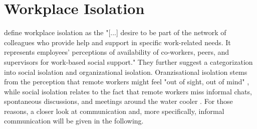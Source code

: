 \section{Workplace Isolation}
\textcite{marshall2007workplace} define workplace isolation as the "[...] desire to be part of the network of colleagues who provide help and support in specific work-related needs. It represents employees' perceptions of availability of co-workers, peers, and supervisors for work-based social support." They further suggest a categorization into social isolation and organizational isolation. Oranzisational isolation stems from the perception that remote workers might feel "out of sight, out of mind" \autocite{bailey1999advantages}, while social isolation relates to the fact that remote workers miss informal chats, spontaneous discussions, and meetings around the water cooler \autocite{cooper2002telecommuting}. For those reasons, a closer look at communication and, more specifically, informal communication will be given in the following.

